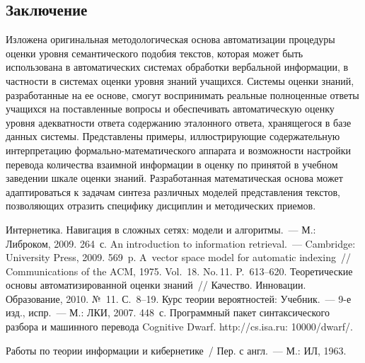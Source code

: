 \begin{multicols}{2}
\vspace*{-9pt}
     
\section{Заключение}

\vspace*{-3pt}

     Изложена оригинальная методологическая основа автоматизации процедуры 
оценки уровня семантического подобия текстов, которая может быть использована в 
автоматических системах обработки вербальной информации, в част\-ности в 
сис\-те\-мах оценки уровня знаний учащихся. Системы оценки знаний, разработанные 
на ее основе, смогут воспринимать реальные полноценные ответы учащихся на 
поставленные вопросы и обеспечивать автоматическую оценку уровня адекватности 
ответа содержанию эталонного ответа, хранящегося в базе данных системы. 
Представлены примеры, иллюстрирующие содержательную интерпретацию\linebreak 
     фор\-маль\-но-ма\-те\-ма\-ти\-че\-ско\-го аппарата и возможности настройки 
перевода количества взаимной информа\-ции в оценку по принятой в учебном 
заведении шкале оценки знаний. Разработанная математическая основа может 
адаптироваться к задачам синтеза различных моделей представления текстов, 
позволяющих отразить специфику дисциплин и методических приемов. 

\vspace*{-6pt}

{\small\frenchspacing
{%
\begin{thebibliography}{9}
    
 Интернетика. Навигация в сложных сетях: модели и 
алгоритмы.~--- М.: Либроком, 2009. 264~с.
 An introduction to 
information retrieval.~--- Cambridge: University Press, 2009. 569~p.
 A~vector space model for automatic 
indexing~// Communications of the ACM, 1975. Vol.~18. No.\,11. P.~613--620. 
 Теоретические основы автоматизированной оценки 
знаний~// Качество. Инновации. Образование, 2010. № \,11. С.~8--19.
 Курс теории вероятностей: Учебник.~--- 9-е изд., испр.~--- 
М.: ЛКИ, 2007. 448~с.
Программный пакет синтаксического разбора и машинного перевода Cognitive 
Dwarf. {\sf http://cs.isa.ru: 10000/dwarf/}.

\label{end\stat}

 Работы по теории информации и кибернетике~/ Пер. с англ.~--- 
М.: ИЛ, 1963.
\end{thebibliography}
}
}

\end{multicols}